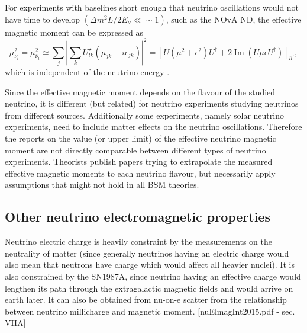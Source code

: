 For experiments with baselines short enough that neutrino oscillations would not have time to develop $\left(\Delta m^2L/2E_{\nu}\ll\sim1\right)$, such as the \gls{NOvA} \gls{ND}, the effective magnetic moment can be expressed as
\begin{equation}
\mu_{\nu_l}^2=\mu_{\overline{\nu}_l}^2\simeq\sum_j\left|\sum_k U_{lk}^{\star}\left(\mu_{jk}-i\epsilon_{jk}\right)\right|^2=\left[U\left(\mu^2+\epsilon^2\right)U^{\dagger}+2\operatorname{Im}\left(U\mu\epsilon U^{\dagger}\right)\right]_{ll^{\prime}},
\end{equation}
which is independent of the neutrino energy .

Since the effective magnetic moment depends on the flavour of the studied neutrino, it is different (but related) for neutrino experiments studying neutrinos from different sources. Additionally some experiments, namely solar neutrino experiments, need to include matter effects on the neutrino oscillations. Therefore the reports on the value (or upper limit) of the effective neutrino magnetic moment are not directly comparable between different types of neutrino experiments. Theorists publish papers trying to extrapolate the measured effective magnetic moments to each neutrino flavour, but necessarily apply assumptions that might not hold in all \gls{BSM} theories.

\subsection{Other neutrino electromagnetic properties}\label{sec:otherNuElmagProperties}


Neutrino electric charge is heavily constraint by the measurements on the neutrality of matter (since generally neutrinos having an electric charge would also mean that neutrons have charge which would affect all heavier nuclei). It is also constrained by the SN1987A, since neutrino having an effective charge would lengthen its path through the extragalactic magnetic fields and would arrive on earth later. It can also be obtained from nu-on-e scatter from the relationship between neutrino millicharge and magnetic moment. [nuElmagInt2015.pdf - sec. VIIA] 

